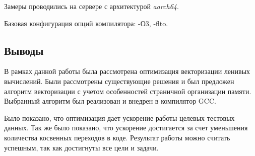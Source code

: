 Замеры проводились на сервере с архитектурой \textit{aarch64}.

Базовая конфигурация опций компилятора: -О3, -flto.

\subsection{Выводы}

В рамках данной работы была рассмотрена оптимизация векторизации ленивых вычислений. Были рассмотрены существующие решения и был предложен алгоритм векторизации с учетом особенностей страничной организации памяти. Выбранный алгоритм был реализован и внедрен в компилятор GCC.

Было показано, что оптимизация дает ускорение работы целевых тестовых данных. Так же было показано, что ускорение достигается за счет уменьшения количества косвенных переходов в коде. Результат работы можно считать успешным, так как достигнуты все цели и задачи.

\newpage

